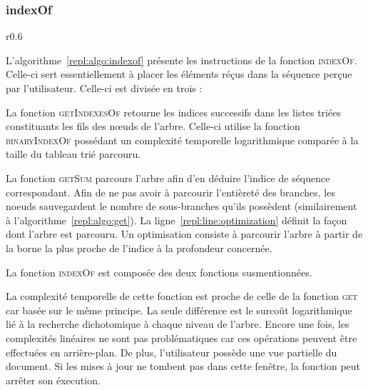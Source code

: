 \subsubsection{indexOf}
\label{repl:subsec:indexof}

\begin{wrapfigure}{r}{0.6\textwidth}
  \vspace{-35pt} %
  \begin{minipage}[t]{0.6\textwidth}
    \begin{algorithm}[H]
      
      \caption{\label{repl:algo:indexof} indexOf.}
    \end{algorithm}
  \end{minipage}
  \vspace{-15pt}
\end{wrapfigure}

L'algorithme~\ref{repl:algo:indexof} présente les instructions de la fonction
\textsc{indexOf}. Celle-ci sert essentiellement à placer les éléments réçus dans
la séquence perçue par l'utilisateur.  Celle-ci est divisée en trois :
\begin{inparaenum}[(i)]
\item La fonction \textsc{getIndexesOf} retourne les indices successifs dans les
  listes triées constituants les fils des nœuds de l'arbre. Celle-ci utilise la
  fonction \textsc{binaryIndexOf} possédant un complexité temporelle
  logarithmique comparée à la taille du tableau trié parcouru.
\item La fonction \textsc{getSum} parcours l'arbre afin d'en déduire l'indice de
  séquence correspondant. Afin de ne pas avoir à parcourir l'entièreté des
  branches, les noeuds sauvegardent le nombre de sous-branches qu'ils possèdent
  (similairement à l'algorithme~\ref{repl:algo:get}).  La
  ligne~\ref{repl:line:optimization} définit la façon dont l'arbre est
  parcouru. Un optimisation consiste à parcourir l'arbre à partir de la borne la
  plus proche de l'indice à la profondeur concernée.
\item La fonction \textsc{indexOf} est composée des deux fonctions
  susmentionnées.
\end{inparaenum}


La complexité temporelle de cette fonction est proche de celle de la fonction
\textsc{get} car basée sur le même principe. La seule différence est le surcoût
logarithmique lié à la recherche dichotomique à chaque niveau de l'arbre. Encore
une fois, les complexités linéaires ne sont pas problématiques car ces
opérations peuvent être effectuées en arrière-plan. De plus, l'utilisateur
possède une vue partielle du document. Si les mises à jour ne tombent pas dans
cette fenêtre, la fonction peut arrêter son éxecution.


